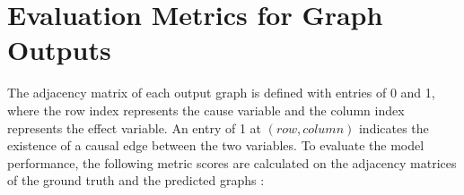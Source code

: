



\section{Evaluation Metrics for Graph Outputs}
\label{appsec:metrics}
The adjacency matrix of each output graph is defined with entries of 0 and 1, where the row index represents the cause variable and the column index represents the effect variable. An entry of 1 at $(row, column)$ indicates the existence of a causal edge between the two variables. To evaluate the model performance, the following metric scores are calculated on the adjacency matrices of the ground truth and the predicted graphs
:

